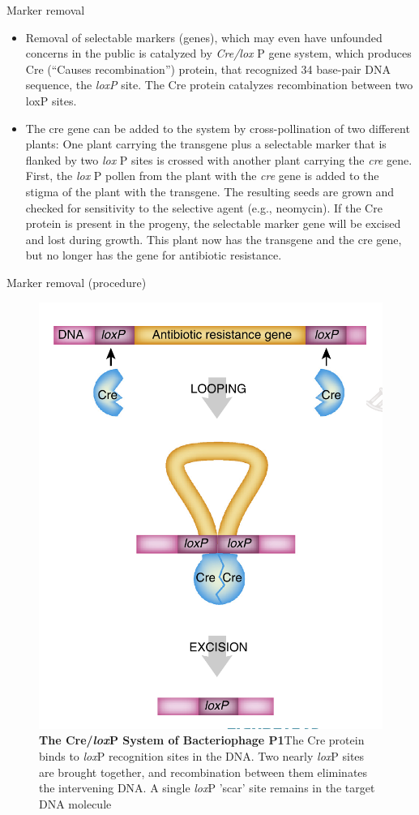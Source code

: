 \documentclass[11pt,dvipsnames,ignorenonframetext,aspectratio=169]{beamer}
\providecommand{\tightlist}{%
  \setlength{\itemsep}{0pt}\setlength{\parskip}{0pt}}
\begin{document}
\begin{frame}{Marker removal}
\protect\hypertarget{marker-removal}{}
\begin{itemize}
\tightlist
\item
  Removal of selectable markers (genes), which may even have unfounded
  concerns in the public is catalyzed by \emph{Cre/lox} P gene system,
  which produces Cre (``Causes recombination'') protein, that recognized
  34 base-pair DNA sequence, the \emph{\emph{loxP}} site. The Cre
  protein catalyzes recombination between two loxP sites.
\item
  The cre gene can be added to the system by cross-pollination of two
  different plants: One plant carrying the transgene plus a selectable
  marker that is flanked by two \emph{lox} P sites is crossed with
  another plant carrying the \emph{cre} gene. First, the \emph{lox} P
  pollen from the plant with the \emph{cre} gene is added to the stigma
  of the plant with the transgene. The resulting seeds are grown and
  checked for sensitivity to the selective agent (e.g., neomycin). If
  the Cre protein is present in the progeny, the selectable marker gene
  will be excised and lost during growth. This plant now has the
  transgene and the cre gene, but no longer has the gene for antibiotic
  resistance.
\end{itemize}
\end{frame}

\begin{frame}{Marker removal (procedure)}
\protect\hypertarget{marker-removal-procedure}{}
\begin{figure}
\includegraphics[width=0.35\linewidth]{../images/marker_removal} \caption{\textbf{The Cre/\textit{lox}P System of Bacteriophage P1}\newline The Cre protein binds to \textit{lox}P recognition sites in the DNA. Two nearly \textit{lox}P sites are brought together, and recombination between them eliminates the intervening DNA. A single \textit{lox}P 'scar' site remains in the target DNA molecule}\label{fig:marker-removal}
\end{figure}
\end{frame}
\end{document}
